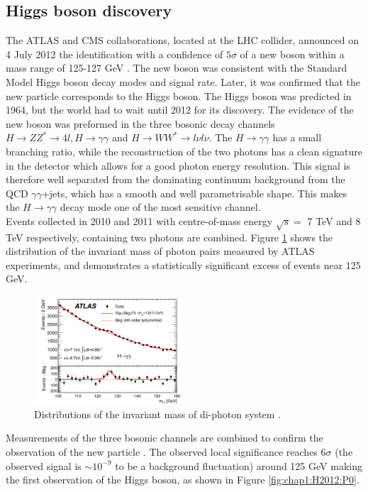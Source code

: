 \subsection{Higgs boson discovery}
\label{chap1:H2012:HM}
The ATLAS and CMS collaborations, located at the LHC collider, announced on 4 July 2012 the identification with a confidence of $5\sigma$ of a new boson within a mass range of 125-127 GeV \cite{ATLAS_2012, CMS_2012}. The new boson was consistent with the Standard Model Higgs boson decay modes and signal rate. Later, it was confirmed that the new particle corresponds to the Higgs boson. The Higgs boson was predicted in 1964, but the world had to wait until 2012 for its discovery. The evidence of the new boson was preformed in the three bosonic decay channels $H\rightarrow ZZ^* \rightarrow 4l, H\rightarrow\gamma\gamma$ and $H\rightarrow WW^*\rightarrow l\nu l\nu$. The $H\rightarrow\gamma\gamma$ has a small branching ratio, while the reconstruction of the two photons has a clean signature in the detector which allows for a good photon energy resolution. This signal is therefore well separated from the dominating continuum background from the QCD $\gamma\gamma$+jets, which has a smooth and well parametrisable shape. This makes the $H\rightarrow\gamma\gamma$ decay mode one of the most sensitive channel.\\ 
Events collected in 2010 and 2011 with centre-of-mass energy $\sqrt{s}=$ 7 TeV and 8 TeV respectively, containing two photons are combined. Figure \ref{fig:chap1:H2012:Hyy} shows the distribution of the invariant mass of photon pairs measured by ATLAS experiments, and demonstrates a statistically significant excess of events near 125 GeV. 
\begin{figure}[htbp]
    \centering
    \includegraphics[width=0.5\textwidth]{Ch1/Img/Hmyy.png}
    \caption{Distributions of the invariant mass of di-photon system \cite{ATLAS_2012}.}
    \label{fig:chap1:H2012:Hyy}
\end{figure}
Measurements of the three bosonic channels are combined to confirm the observation of the new particle \cite{ATLAS_2012}. The observed local significance reaches $6\sigma$ (the observed signal is $\sim10^{-9}$ to be a background fluctuation) around 125 GeV making the first observation of the Higgs boson, as shown in Figure \ref{fig:chap1:H2012:P0}.

